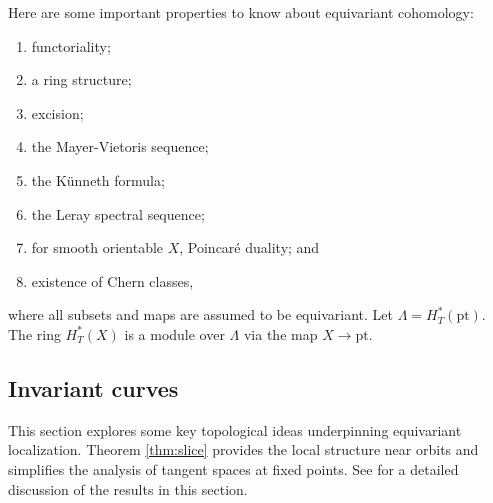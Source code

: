 Here are some important properties to know about equivariant cohomology:
\begin{enumerate}
	\item functoriality;
	\item a ring structure;
	\item excision;
	\item the Mayer-Vietoris sequence;
	\item the Künneth formula;
	\item the Leray spectral sequence;
	\item for smooth orientable $X$, Poincaré duality; and
	\item existence of Chern classes,
\end{enumerate}
where all subsets and maps are assumed to be equivariant. Let $\Lambda = H_T^*(\text{pt})$. The ring $H^*_T(X)$ is a module over $\Lambda$ via the map $X \to \text{pt}$.


\subsection{Invariant curves}
This section explores some key topological ideas underpinning equivariant localization. Theorem \ref{thm:slice} provides the local structure near orbits and simplifies the analysis of tangent spaces at fixed points. See \cite{fulton-anderson} for a detailed discussion of the results in this section.

